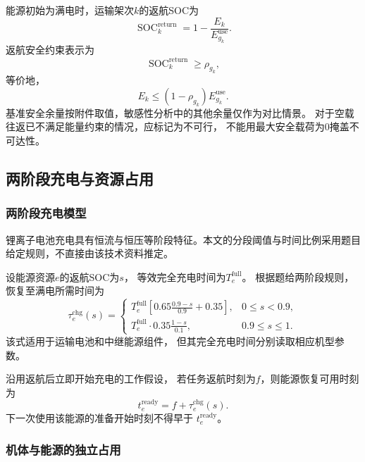 \documentclass[bwprint]{gmcmthesis}
\begin{document}
能源初始为满电时，运输架次$k$的返航SOC为
\begin{equation}
    \operatorname{SOC}_k^{\mathrm{return}}
    =
    1-\frac{E_k}{E_{g_k}^{\mathrm{use}}}.
\end{equation}
返航安全约束表示为
\begin{equation}
    \operatorname{SOC}_k^{\mathrm{return}}
    \geq \rho_{g_k},
\end{equation}
等价地，
\begin{equation}
    E_k
    \leq
    (1-\rho_{g_k})E_{g_k}^{\mathrm{use}}.
\end{equation}
基准安全余量按附件取值，敏感性分析中的其他余量仅作为对比情景。
对于空载往返已不满足能量约束的情况，应标记为不可行，
不能用最大安全载荷为0掩盖不可达性。

\subsection{两阶段充电与资源占用}

\subsubsection{两阶段充电模型}
锂离子电池充电具有恒流与恒压等阶段特征\cite{ti2022}。本文的分段阈值与时间比例采用题目给定规则，不直接由该技术资料推定。


设能源资源$e$的返航SOC为$s$，
等效完全充电时间为$T_e^{\mathrm{full}}$。
根据题给两阶段规则，恢复至满电所需时间为
\begin{equation}
    \tau_e^{\mathrm{chg}}(s)
    =
    \begin{cases}
        T_e^{\mathrm{full}}
        \left[
        0.65\displaystyle\frac{0.9-s}{0.9}+0.35
        \right],
        & 0\leq s<0.9,\\[8pt]
        T_e^{\mathrm{full}}
        \cdot0.35\displaystyle\frac{1-s}{0.1},
        & 0.9\leq s\leq1.
    \end{cases}
\end{equation}
该式适用于运输电池和中继能源组件，
但其完全充电时间分别读取相应机型参数。

沿用返航后立即开始充电的工作假设，
若任务返航时刻为$f$，则能源恢复可用时刻为
\begin{equation}
    t_e^{\mathrm{ready}}
    =
    f+\tau_e^{\mathrm{chg}}(s).
\end{equation}
下一次使用该能源的准备开始时刻不得早于
$t_e^{\mathrm{ready}}$。

\subsubsection{机体与能源的独立占用}
\end{document}
